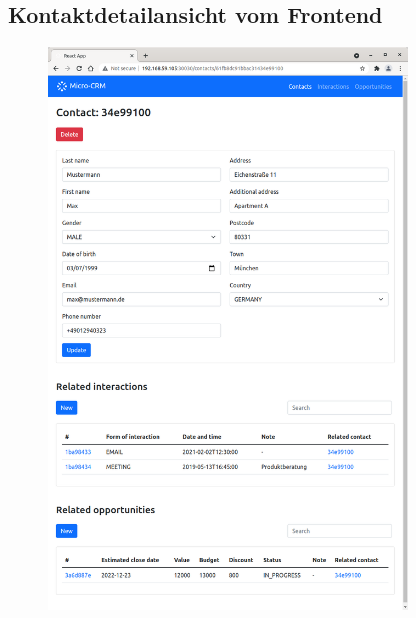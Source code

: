 \clearpage
\subsection*{Kontaktdetailansicht vom Frontend}

\begin{figure}[H] 
    \centering
    \includegraphics[width=0.85\textwidth]{figures/FrontendKontakt.png}
\end{figure}

\clearpage
